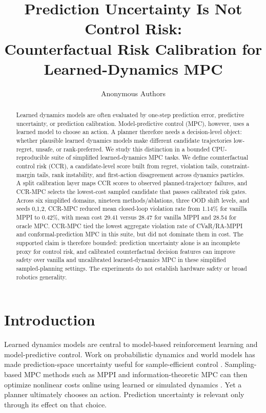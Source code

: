\documentclass[11pt]{article}
\title{Prediction Uncertainty Is Not Control Risk:\\
Counterfactual Risk Calibration for Learned-Dynamics MPC}
\author{Anonymous Authors}
\date{}
\begin{document}
\maketitle

\begin{abstract}
Learned dynamics models are often evaluated by one-step prediction error, predictive uncertainty, or prediction calibration. Model-predictive control (MPC), however, uses a learned model to choose an action. A planner therefore needs a decision-level object: whether plausible learned dynamics models make different candidate trajectories low-regret, unsafe, or rank-preferred. We study this distinction in a bounded CPU-reproducible suite of simplified learned-dynamics MPC tasks. We define counterfactual control risk (CCR), a candidate-level score built from regret, violation tails, constraint-margin tails, rank instability, and first-action disagreement across dynamics particles. A split calibration layer maps CCR scores to observed planned-trajectory failures, and CCR-MPC selects the lowest-cost sampled candidate that passes calibrated risk gates. Across six simplified domains, nineteen methods/ablations, three OOD shift levels, and seeds 0,1,2, CCR-MPC reduced mean closed-loop violation rate from 1.14\% for vanilla MPPI to 0.42\%, with mean cost 29.41 versus 28.47 for vanilla MPPI and 28.54 for oracle MPC. CCR-MPC tied the lowest aggregate violation rate of CVaR/RA-MPPI and conformal-prediction MPC in this suite, but did not dominate them in cost. The supported claim is therefore bounded: prediction uncertainty alone is an incomplete proxy for control risk, and calibrated counterfactual decision features can improve safety over vanilla and uncalibrated learned-dynamics MPC in these simplified sampled-planning settings. The experiments do not establish hardware safety or broad robotics generality.
\end{abstract}

\section{Introduction}

Learned dynamics models are central to model-based reinforcement learning and model-predictive control. Work on probabilistic dynamics and world models has made prediction-space uncertainty useful for sample-efficient control \citep{chua2018pets,hafner2020dreamer,lakshminarayanan2017deepensembles}. Sampling-based MPC methods such as MPPI and information-theoretic MPC can then optimize nonlinear costs online using learned or simulated dynamics \citep{williams2017mppi,williams2017itm}. Yet a planner ultimately chooses an action. Prediction uncertainty is relevant only through its effect on that choice.
\end{document}
